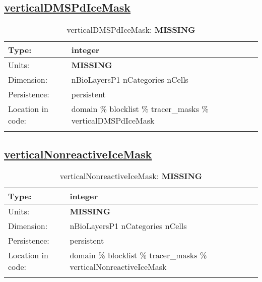 \subsection[verticalDMSPdIceMask]{\hyperref[sec:var_tab_tracer_masks]{verticalDMSPdIceMask}}
\label{subsec:var_sec_tracer_masks_verticalDMSPdIceMask}
\begin{center}
\begin{longtable}{| p{2.0in} | p{4.0in} |}
        \hline 
        Type: & integer \\
        \hline 
        Units: & {\bf \color{red} MISSING} \\
        \hline 
        Dimension: & nBioLayersP1 nCategories nCells \\
        \hline 
        Persistence: & persistent \\
        \hline 
         Location in code: & domain \% blocklist \% tracer\_masks \% verticalDMSPdIceMask \\
         \hline 
    \caption{verticalDMSPdIceMask: {\bf \color{red} MISSING}}
\end{longtable}
\end{center}
\subsection[verticalNonreactiveIceMask]{\hyperref[sec:var_tab_tracer_masks]{verticalNonreactiveIceMask}}
\label{subsec:var_sec_tracer_masks_verticalNonreactiveIceMask}
\begin{center}
\begin{longtable}{| p{2.0in} | p{4.0in} |}
        \hline 
        Type: & integer \\
        \hline 
        Units: & {\bf \color{red} MISSING} \\
        \hline 
        Dimension: & nBioLayersP1 nCategories nCells \\
        \hline 
        Persistence: & persistent \\
        \hline 
         Location in code: & domain \% blocklist \% tracer\_masks \% verticalNonreactiveIceMask \\
         \hline 
    \caption{verticalNonreactiveIceMask: {\bf \color{red} MISSING}}
\end{longtable}
\end{center}

